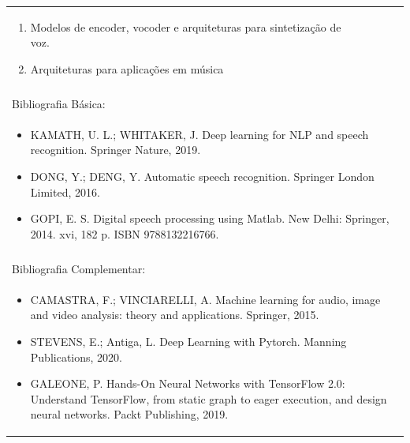 \documentclass[11pt]{article}
\begin{document}
\begin{center}
\begin{longtable}{|p{4cm}|p{4cm}|p{4cm}|p{4cm}|}
{\begin{enumerate}
\item Modelos de encoder, vocoder e arquiteturas para sintetização de voz.
\item Arquiteturas para aplicações em música\end{enumerate}}\\
\multicolumn{4}{|p{16cm}|}{}\\
\hline
\multicolumn{4}{|p{16cm}|}{Bibliografia Básica:}\\
\multicolumn{4}{|p{16cm}|}{%
\begin{itemize}\item KAMATH, U. L.; WHITAKER, J. Deep learning for NLP and speech recognition. Springer Nature, 2019.
\item DONG, Y.; DENG, Y. Automatic speech recognition. Springer London Limited, 2016.
\item GOPI, E. S. Digital speech processing using Matlab. New Delhi: Springer, 2014. xvi, 182 p. ISBN 9788132216766.\end{itemize}}\\
\multicolumn{4}{|p{16cm}|}{}\\
\hline
\multicolumn{4}{|p{16cm}|}{Bibliografia Complementar:}\\
\multicolumn{4}{|p{16cm}|}{%
\begin{itemize}\item CAMASTRA, F.; VINCIARELLI, A. Machine learning for audio, image and video analysis: theory and applications. Springer, 2015.
\item STEVENS, E.; Antiga, L. Deep Learning with Pytorch. Manning Publications, 2020.
\item GALEONE, P. Hands-On Neural Networks with TensorFlow 2.0: Understand TensorFlow, from static graph to eager execution, and design neural networks. Packt Publishing, 2019.\end{itemize}}\\
\hline
\end{longtable}
\end{center}
\end{document}
